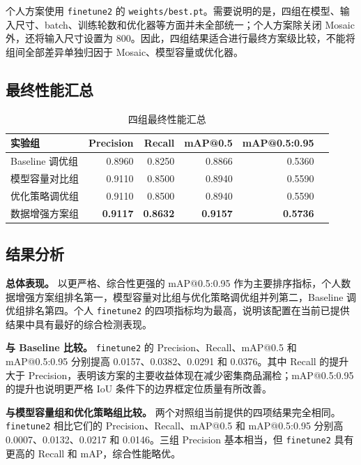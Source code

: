 \documentclass[12pt,a4paper]{ctexart}
\begin{document}
个人方案使用 \texttt{finetune2} 的 \texttt{weights/best.pt}。需要说明的是，四组在模型、输入尺寸、batch、训练轮数和优化器等方面并未全部统一；个人方案除关闭 Mosaic 外，还将输入尺寸设置为 800。因此，四组结果适合进行最终方案级比较，不能将组间全部差异单独归因于 Mosaic、模型容量或优化器。

\subsection{最终性能汇总}

\begin{table}[H]
\centering
\caption{四组最终性能汇总}
\small
\begin{tabular}{p{3.0cm}rrrrp{5.0cm}}
\toprule
\textbf{实验组} & \textbf{Precision} & \textbf{Recall} & \textbf{mAP@0.5} & \textbf{mAP@0.5:0.95} \\
\midrule
Baseline 调优组 & 0.8960 & 0.8250 & 0.8866 & 0.5360 \\
模型容量对比组 & 0.9110 & 0.8500 & 0.8940 & 0.5590  \\
优化策略调优组 & 0.9110 & 0.8500 & 0.8940 & 0.5590  \\
数据增强方案组 & \textbf{0.9117} & \textbf{0.8632} & \textbf{0.9157} & \textbf{0.5736}  \\
\bottomrule
\end{tabular}
\end{table}

\subsection{结果分析}

\textbf{总体表现。} 以更严格、综合性更强的 mAP@0.5:0.95 作为主要排序指标，个人数据增强方案组排名第一，模型容量对比组与优化策略调优组并列第二，Baseline 调优组排名第四。个人 \texttt{finetune2} 的四项指标均为最高，说明该配置在当前已提供结果中具有最好的综合检测表现。

\textbf{与 Baseline 比较。} \texttt{finetune2} 的 Precision、Recall、mAP@0.5 和 mAP@0.5:0.95 分别提高 0.0157、0.0382、0.0291 和 0.0376。其中 Recall 的提升大于 Precision，表明该方案的主要收益体现在减少密集商品漏检；mAP@0.5:0.95 的提升也说明更严格 IoU 条件下的边界框定位质量有所改善。

\textbf{与模型容量组和优化策略组比较。} 两个对照组当前提供的四项结果完全相同。\texttt{finetune2} 相比它们的 Precision、Recall、mAP@0.5 和 mAP@0.5:0.95 分别高 0.0007、0.0132、0.0217 和 0.0146。三组 Precision 基本相当，但 \texttt{finetune2} 具有更高的 Recall 和 mAP，综合性能略优。
\end{document}

